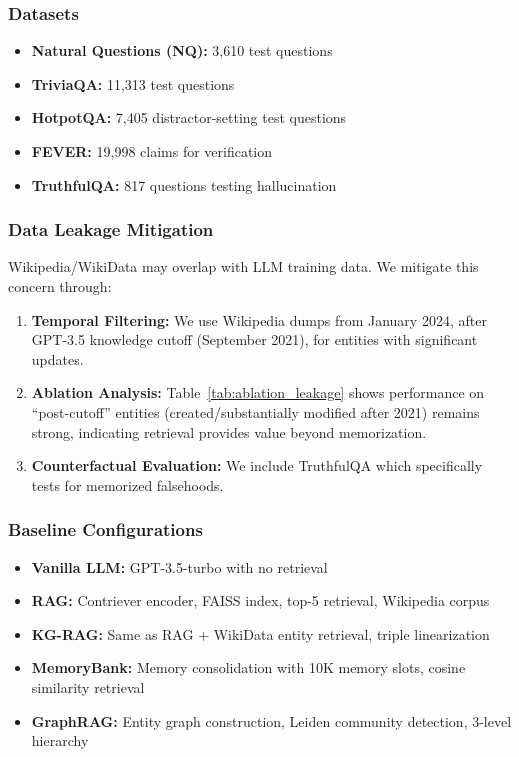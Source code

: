 \documentclass[conference]{IEEEtran}
\begin{document}
\subsubsection{Datasets}

\begin{itemize}[leftmargin=*]
    \item \textbf{Natural Questions (NQ):} 3,610 test questions
    \item \textbf{TriviaQA:} 11,313 test questions
    \item \textbf{HotpotQA:} 7,405 distractor-setting test questions
    \item \textbf{FEVER:} 19,998 claims for verification
    \item \textbf{TruthfulQA:} 817 questions testing hallucination
\end{itemize}

\subsubsection{Data Leakage Mitigation}
\label{sec:data_leakage}

Wikipedia/WikiData may overlap with LLM training data. We mitigate this concern through:
\begin{enumerate}[leftmargin=*]
    \item \textbf{Temporal Filtering:} We use Wikipedia dumps from January 2024, after GPT-3.5 knowledge cutoff (September 2021), for entities with significant updates.
    \item \textbf{Ablation Analysis:} Table~\ref{tab:ablation_leakage} shows performance on ``post-cutoff'' entities (created/substantially modified after 2021) remains strong, indicating retrieval provides value beyond memorization.
    \item \textbf{Counterfactual Evaluation:} We include TruthfulQA which specifically tests for memorized falsehoods.
\end{enumerate}

\subsubsection{Baseline Configurations}
\label{sec:baselines}

\begin{itemize}[leftmargin=*]
    \item \textbf{Vanilla LLM:} GPT-3.5-turbo with no retrieval
    \item \textbf{RAG:} Contriever encoder, FAISS index, top-5 retrieval, Wikipedia corpus \cite{lewis2020retrieval}
    \item \textbf{KG-RAG:} Same as RAG + WikiData entity retrieval, triple linearization \cite{baek2023knowledge}
    \item \textbf{MemoryBank:} Memory consolidation with 10K memory slots, cosine similarity retrieval \cite{zhong2023memorybank}
    \item \textbf{GraphRAG:} Entity graph construction, Leiden community detection, 3-level hierarchy \cite{edge2024graphrag}
\end{itemize}
\end{document}
